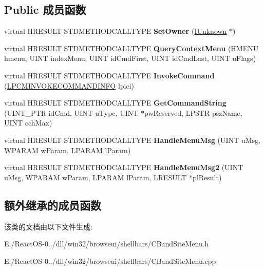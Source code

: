\subsection*{Public 成员函数}
\begin{DoxyCompactItemize}
\item 
\mbox{\label{class_c_band_site_menu_a6e7db7304a9a4e763b4a86cb6c753c72}} 
virtual H\+R\+E\+S\+U\+LT S\+T\+D\+M\+E\+T\+H\+O\+D\+C\+A\+L\+L\+T\+Y\+PE {\bfseries Set\+Owner} (\hyperlink{interface_i_unknown}{I\+Unknown} $\ast$)
\item 
\mbox{\label{class_c_band_site_menu_a2eabe09618351404a523108f608015c7}} 
virtual H\+R\+E\+S\+U\+LT S\+T\+D\+M\+E\+T\+H\+O\+D\+C\+A\+L\+L\+T\+Y\+PE {\bfseries Query\+Context\+Menu} (H\+M\+E\+NU hmenu, U\+I\+NT index\+Menu, U\+I\+NT id\+Cmd\+First, U\+I\+NT id\+Cmd\+Last, U\+I\+NT u\+Flags)
\item 
\mbox{\label{class_c_band_site_menu_a977ea67c285909936f60ade304770466}} 
virtual H\+R\+E\+S\+U\+LT S\+T\+D\+M\+E\+T\+H\+O\+D\+C\+A\+L\+L\+T\+Y\+PE {\bfseries Invoke\+Command} (\hyperlink{struct_i_context_menu_1_1tag_c_m_i_n_v_o_k_e_c_o_m_m_a_n_d_i_n_f_o}{L\+P\+C\+M\+I\+N\+V\+O\+K\+E\+C\+O\+M\+M\+A\+N\+D\+I\+N\+FO} lpici)
\item 
\mbox{\label{class_c_band_site_menu_a2b682f89f62d744b9c30a17798233bcc}} 
virtual H\+R\+E\+S\+U\+LT S\+T\+D\+M\+E\+T\+H\+O\+D\+C\+A\+L\+L\+T\+Y\+PE {\bfseries Get\+Command\+String} (U\+I\+N\+T\+\_\+\+P\+TR id\+Cmd, U\+I\+NT u\+Type, U\+I\+NT $\ast$pw\+Reserved, L\+P\+S\+TR psz\+Name, U\+I\+NT cch\+Max)
\item 
\mbox{\label{class_c_band_site_menu_a105ac4c491c13ec26f9ad54fa997c5a1}} 
virtual H\+R\+E\+S\+U\+LT S\+T\+D\+M\+E\+T\+H\+O\+D\+C\+A\+L\+L\+T\+Y\+PE {\bfseries Handle\+Menu\+Msg} (U\+I\+NT u\+Msg, W\+P\+A\+R\+AM w\+Param, L\+P\+A\+R\+AM l\+Param)
\item 
\mbox{\label{class_c_band_site_menu_a1fdf2a328911c14e5d86aaf245c1f31a}} 
virtual H\+R\+E\+S\+U\+LT S\+T\+D\+M\+E\+T\+H\+O\+D\+C\+A\+L\+L\+T\+Y\+PE {\bfseries Handle\+Menu\+Msg2} (U\+I\+NT u\+Msg, W\+P\+A\+R\+AM w\+Param, L\+P\+A\+R\+AM l\+Param, L\+R\+E\+S\+U\+LT $\ast$pl\+Result)
\end{DoxyCompactItemize}
\subsection*{额外继承的成员函数}


该类的文档由以下文件生成\+:\begin{DoxyCompactItemize}
\item 
E\+:/\+React\+O\+S-\/0../dll/win32/browseui/shellbars/C\+Band\+Site\+Menu.\+h\item 
E\+:/\+React\+O\+S-\/0../dll/win32/browseui/shellbars/C\+Band\+Site\+Menu.\+cpp\end{DoxyCompactItemize}
